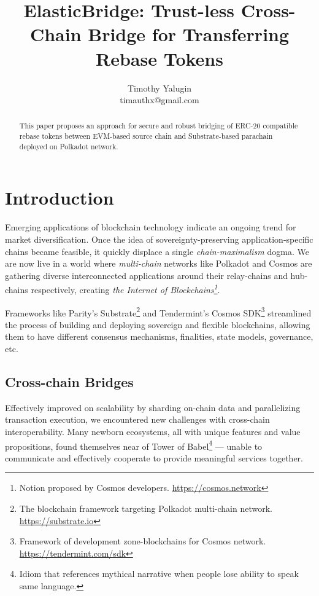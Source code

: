 \documentclass{article}
\title{ElasticBridge: Trust-less Cross-Chain Bridge for Transferring Rebase Tokens}
\author{Timothy Yalugin\\timauthx@gmail.com}
\begin{document}
\maketitle

\begin{abstract}

This paper proposes an approach for secure and robust bridging of ERC-20 compatible rebase tokens between EVM-based source chain and Substrate-based parachain deployed on Polkadot network.

\end{abstract}

\section{Introduction}

Emerging applications of blockchain technology indicate an ongoing trend for market diversification. Once the idea of sovereignty-preserving application-specific chains became feasible, it quickly displace a single \textit{chain-maximalism} dogma. We are now live in a world where \textit{multi-chain} networks like Polkadot \cite{wood2016polkadot} and Cosmos \cite{kwon2016cosmos} are gathering diverse interconnected applications around their relay-chains and hub-chains respectively, creating \textit{the Internet of Blockchains\footnote{Notion proposed by Cosmos developers. \url{https://cosmos.network}}}.

Frameworks like Parity's Substrate\footnote{The blockchain framework
targeting Polkadot multi-chain network. \url{https://substrate.io}} and Tendermint's Cosmos SDK\footnote{Framework of development zone-blockchains for Cosmos network. \url{https://tendermint.com/sdk}} streamlined the process of building and deploying sovereign and flexible blockchains, allowing them to have different consensus mechanisms, finalities, state models, governance, etc.

\subsection{Cross-chain Bridges}

Effectively improved on scalability by sharding on-chain data and parallelizing transaction execution, we encountered new challenges with cross-chain interoperability. Many newborn ecosystems, all with unique features and value propositions, found themselves near of Tower of Babel\footnote{Idiom that references mythical narrative when people lose ability to speak same language. } --- unable to communicate and effectively cooperate to provide meaningful services together.
\end{document}
